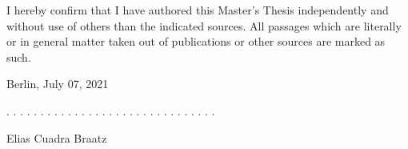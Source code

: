 \documentclass[a4paper,11pt]{article}
\newcommand{\thesistype}{Master's Thesis}
\newcommand{\thesisauthor}{Elias Cuadra Braatz}
\newcommand{\thesisdate}{July 07, 2021}
\begin{document}
I hereby confirm that I have authored this \thesistype{} independently and
without use of others than the indicated sources. All passages which are
literally or in general matter taken out of publications or other sources are
marked as such.
\vspace{1cm}

Berlin, \thesisdate{}
\vspace{3cm}

. . . . . . . . . . . . . . . . . . . . . . . . . . . . . . .
\vspace{0.1cm}

\thesisauthor{}
\end{document}
